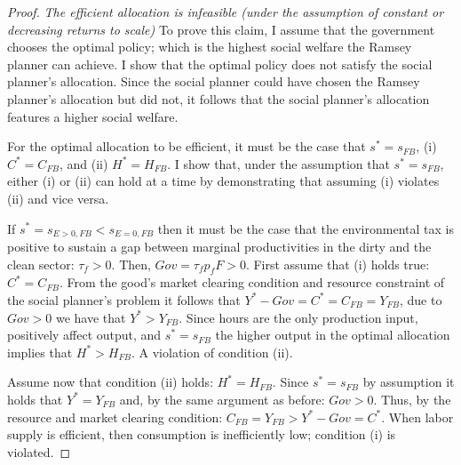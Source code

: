 \begin{proof}\textit{The efficient allocation is infeasible (under the assumption of constant or decreasing returns to scale)}
	To prove this claim, I assume that the government chooses the optimal policy; which is the highest social welfare the Ramsey planner can achieve. I show that the optimal policy does not satisfy the social planner's allocation. Since the social planner could have chosen the Ramsey planner's allocation  but did not, it follows that the social planner's allocation features a higher social welfare.
	
	For the optimal allocation to be efficient, it must be the case that $s^*=s_{FB}$, (i) $C^*=C_{FB}$, and (ii) $H^*=H_{FB}$. I show that, under the assumption that $s^*=s_{FB}$, either (i) or (ii) can hold at a time by demonstrating that assuming (i) violates (ii) and vice versa.
	
	
	
	
	If $s^*=s_{E>0,FB}<s_{E=0,FB}$ then it must be the case that the environmental tax is positive to sustain a gap between marginal productivities in the dirty and the clean sector: $\tau_f>0$. Then, $Gov=\tau_fp_fF>0$. 
	First assume that (i) holds true: $C^*=C_{FB}$. From the good's market clearing condition and resource constraint of the social planner's problem it follows that
	$Y^*-Gov=C^*=C_{FB}=Y_{FB}$, due to  $Gov>0$ we have that $Y^*>Y_{FB}$. Since hours are the only production input, positively affect output, and $s^*=s_{FB}$ the higher output in the optimal allocation implies that $H^*>H_{FB}$. A violation of condition (ii). 
	
	Assume now that condition (ii) holds: $H^*=H_{FB}$. Since $s^*=s_{FB}$ by assumption it holds that $Y^*=Y_{FB}$ and, by the same argument as before: $Gov>0$. Thus, by the resource and market clearing condition: $C_{FB}=Y_{FB}>Y^*-Gov=C^*$. When labor supply is efficient, then consumption is inefficiently low; condition (i) is violated. 
	

\end{proof}
